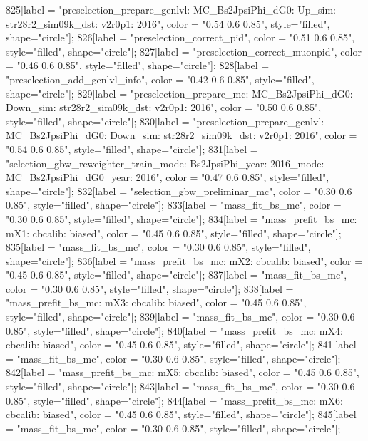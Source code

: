 {	825[label = "preselection_prepare_genlvl\nmode: MC_Bs2JpsiPhi_dG0\npolarity: Up\nstrip_sim: str28r2_sim09k_dst\nversion: v2r0p1\nyear: 2016", color = "0.54 0.6 0.85", style="filled", shape="circle"];
	826[label = "preselection_correct_pid", color = "0.51 0.6 0.85", style="filled", shape="circle"];
	827[label = "preselection_correct_muonpid", color = "0.46 0.6 0.85", style="filled", shape="circle"];
	828[label = "preselection_add_genlvl_info", color = "0.42 0.6 0.85", style="filled", shape="circle"];
	829[label = "preselection_prepare_mc\nmode: MC_Bs2JpsiPhi_dG0\npolarity: Down\nstrip_sim: str28r2_sim09k_dst\nversion: v2r0p1\nyear: 2016", color = "0.50 0.6 0.85", style="filled", shape="circle"];
	830[label = "preselection_prepare_genlvl\nmode: MC_Bs2JpsiPhi_dG0\npolarity: Down\nstrip_sim: str28r2_sim09k_dst\nversion: v2r0p1\nyear: 2016", color = "0.54 0.6 0.85", style="filled", shape="circle"];
	831[label = "selection_gbw_reweighter_train\ndata_mode: Bs2JpsiPhi\ndata_year: 2016\nmc_mode: MC_Bs2JpsiPhi_dG0\nmc_year: 2016", color = "0.47 0.6 0.85", style="filled", shape="circle"];
	832[label = "selection_gbw_preliminar_mc", color = "0.30 0.6 0.85", style="filled", shape="circle"];
	833[label = "mass_fit_bs_mc", color = "0.30 0.6 0.85", style="filled", shape="circle"];
	834[label = "mass_prefit_bs_mc\nmassbin: mX1\nmassmodel: cbcalib\ntrigger: biased", color = "0.45 0.6 0.85", style="filled", shape="circle"];
	835[label = "mass_fit_bs_mc", color = "0.30 0.6 0.85", style="filled", shape="circle"];
	836[label = "mass_prefit_bs_mc\nmassbin: mX2\nmassmodel: cbcalib\ntrigger: biased", color = "0.45 0.6 0.85", style="filled", shape="circle"];
	837[label = "mass_fit_bs_mc", color = "0.30 0.6 0.85", style="filled", shape="circle"];
	838[label = "mass_prefit_bs_mc\nmassbin: mX3\nmassmodel: cbcalib\ntrigger: biased", color = "0.45 0.6 0.85", style="filled", shape="circle"];
	839[label = "mass_fit_bs_mc", color = "0.30 0.6 0.85", style="filled", shape="circle"];
	840[label = "mass_prefit_bs_mc\nmassbin: mX4\nmassmodel: cbcalib\ntrigger: biased", color = "0.45 0.6 0.85", style="filled", shape="circle"];
	841[label = "mass_fit_bs_mc", color = "0.30 0.6 0.85", style="filled", shape="circle"];
	842[label = "mass_prefit_bs_mc\nmassbin: mX5\nmassmodel: cbcalib\ntrigger: biased", color = "0.45 0.6 0.85", style="filled", shape="circle"];
	843[label = "mass_fit_bs_mc", color = "0.30 0.6 0.85", style="filled", shape="circle"];
	844[label = "mass_prefit_bs_mc\nmassbin: mX6\nmassmodel: cbcalib\ntrigger: biased", color = "0.45 0.6 0.85", style="filled", shape="circle"];
	845[label = "mass_fit_bs_mc", color = "0.30 0.6 0.85", style="filled", shape="circle"];
}
